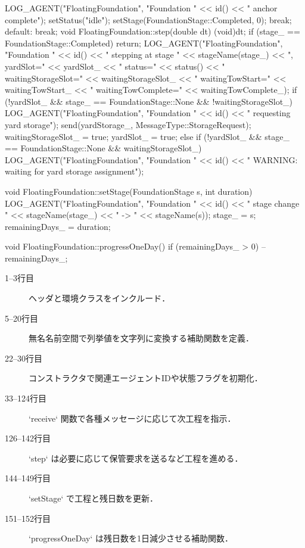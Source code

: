 \documentclass[10pt,letterpaper]{jsarticle}
\begin{document}
\begin{cppcode}
{{        LOG_AGENT("FloatingFoundation", "Foundation " << id() << " anchor complete");
        setStatus("idle");
        setStage(FoundationStage::Completed, 0);
        break;
    default:
        break;
    }
}
void FloatingFoundation::step(double dt) {
    (void)dt;
    if (stage_ == FoundationStage::Completed) return;
    LOG_AGENT("FloatingFoundation", "Foundation " << id() << " stepping at stage " << stageName(stage_)
              << ", yardSlot=" << yardSlot_ << " status=" << status()
              << " waitingStorageSlot=" << waitingStorageSlot_
              << " waitingTowStart=" << waitingTowStart_
              << " waitingTowComplete=" << waitingTowComplete_);
    if (!yardSlot_ && stage_ == FoundationStage::None && !waitingStorageSlot_) {
        LOG_AGENT("FloatingFoundation", "Foundation " << id() << " requesting yard storage");
        send(yardStorage_, MessageType::StorageRequest);
        waitingStorageSlot_ = true;
        yardSlot_ = true;
    } else if (!yardSlot_ && stage_ == FoundationStage::None && waitingStorageSlot_) {
        LOG_AGENT("FloatingFoundation", "Foundation " << id() << " WARNING: waiting for yard storage assignment");
    }
}

void FloatingFoundation::setStage(FoundationStage s, int duration) {
    LOG_AGENT("FloatingFoundation", "Foundation " << id() << " stage change " << stageName(stage_)
              << " -> " << stageName(s));
    stage_ = s;
    remainingDays_ = duration;
}

void FloatingFoundation::progressOneDay() {
    if (remainingDays_ > 0) --remainingDays_;
}
\end{cppcode}
\begin{description}
  \item[1--3行目] ヘッダと環境クラスをインクルード．
  \item[5--20行目] 無名名前空間で列挙値を文字列に変換する補助関数を定義．
  \item[22--30行目] コンストラクタで関連エージェントIDや状態フラグを初期化．
  \item[33--124行目] `receive` 関数で各種メッセージに応じて次工程を指示．
  \item[126--142行目] `step` は必要に応じて保管要求を送るなど工程を進める．
  \item[144--149行目] `setStage` で工程と残日数を更新．
  \item[151--152行目] `progressOneDay` は残日数を1日減少させる補助関数．
\end{description}
\end{document}
